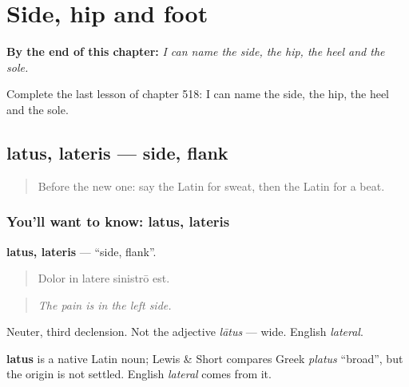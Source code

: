 
\chapter{Side, hip and foot}
\label{ch:la-side-hip-and-foot}

\begin{chapteropening}
\textbf{By the end of this chapter:} \emph{I can name the side, the hip, the heel and the sole.}

Complete the last lesson of chapter 518: I can name the side, the hip, the heel and the sole.
\end{chapteropening}

\section[latus, lateris]{latus, lateris — side, flank}

\label{lesson:LA-C518-latus}



\begin{quote}
Before the new one: say the Latin for sweat, then the Latin for a beat.
\end{quote}

\subsection*{You'll want to know: latus, lateris}
\textbf{latus, lateris} — \textquotedblleft{}side, flank\textquotedblright{}.

\begin{quote}
Dolor in latere sinistrō est.
\end{quote}

\begin{quote}
\emph{The pain is in the left side.}
\end{quote}

Neuter, third declension. Not the adjective \emph{lātus} — wide. English \emph{lateral}.

\begin{cousinweb}
\textbf{latus} is a native Latin noun; Lewis \& Short compares Greek \emph{platus} \textquotedblleft{}broad\textquotedblright{}, but the origin is not settled. English \emph{lateral} comes from it.
\end{cousinweb}

